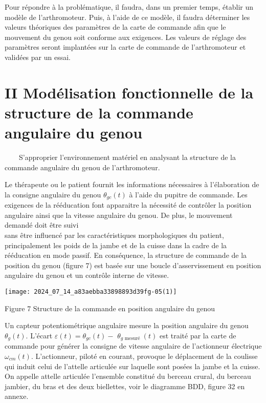 Pour répondre à la problématique, il faudra, dans un premier temps, établir un modèle de l'arthromoteur. Puis, à l'aide de ce modèle, il faudra déterminer les valeurs théoriques des paramètres de la carte de commande afin que le mouvement du genou soit conforme aux exigences. Les valeurs de réglage des paramètres seront implantées sur la carte de commande de l'arthromoteur et validées par un essai.

\section*{II Modélisation fonctionnelle de la structure de la commande angulaire du genou}
 $\qquad$S'approprier l'environnement matériel en analysant la structure de la commande angulaire du genou de l'arthromoteur.

Le thérapeute ou le patient fournit les informations nécessaires à l'élaboration de la consigne angulaire du genou $\theta_{g c}(t)$ à l'aide du pupitre de commande. Les exigences de la rééducation font apparaitre la nécessité de contrôler la position angulaire ainsi que la vitesse angulaire du genou. De plus, le mouvement demandé doit être suivi\\
sans être influencé par les caractéristiques morphologiques du patient, principalement les poids de la jambe et de la cuisse dans la cadre de la rééducation en mode passif. En conséquence, la structure de commande de la position du genou (figure 7) est basée sur une boucle d'asservissement en position angulaire du genou et un contrôle interne de vitesse.

\begin{center}
\texttt{[image: 2024\_07\_14\_a83aebba33898893d39fg-05(1)]}
\end{center}

Figure 7 Structure de la commande en position angulaire du genou

Un capteur potentiométrique angulaire mesure la position angulaire du genou $\theta_{g}(t)$. L'écart $\varepsilon(t)=\theta_{g c}(t)-$ $\theta_{g \text { mesuré }}(t)$ est traité par la carte de commande pour générer la consigne de vitesse angulaire de l'actionneur électrique $\omega_{c m}(t)$. L'actionneur, piloté en courant, provoque le déplacement de la coulisse qui induit celui de l'attelle articulée sur laquelle sont posées la jambe et la cuisse. On appelle attelle articulée l'ensemble constitué du berceau crural, du berceau jambier, du bras et des deux biellettes, voir le diagramme BDD, figure 32 en annexe.

